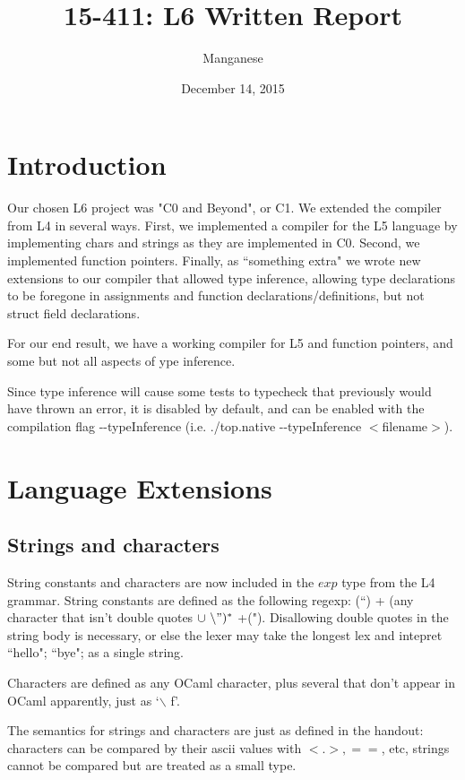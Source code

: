 \documentclass{article}
\title{15-411: L6 Written Report}
\author{Manganese}
\date{December 14, 2015}
\begin{document}
\maketitle

\section{Introduction}

Our chosen L6 project was "C0 and Beyond", or C1. We extended the compiler from L4 in several ways. First, we implemented a compiler for the L5 language by implementing chars and strings as they are implemented in C0. Second, we implemented function pointers. Finally, as ``something extra" we wrote new extensions to our compiler that allowed type inference, allowing type declarations to be foregone in assignments and function declarations/definitions, but not struct field declarations.

For our end result, we have a working compiler for L5 and function pointers, and some but not all aspects of ype inference.


Since type inference will cause some tests to typecheck that previously would have thrown an error, it is disabled by default, and can be enabled with the compilation flag -{}-typeInference (i.e. ./top.native  -{}-typeInference $<$filename$>$).
\section{Language Extensions}


\subsection{Strings and characters}
String constants and characters are now included in the $exp$ type from the L4 grammar. String constants are defined as the following regexp: (``) + (any character that isn't double quotes $\cup \  \backslash")^*$ +("). Disallowing double quotes in the string body is necessary, or else the lexer may take the longest lex and intepret ``hello"; ``bye"; as a single string.

Characters are defined as any OCaml character, plus several that don't appear in OCaml apparently, just as `$\backslash$ f'.

The semantics for strings and characters are just as defined in the handout: characters can be compared by their ascii values with $<. >, ==$, etc, strings cannot be compared but are treated as a small type.
\end{document}

